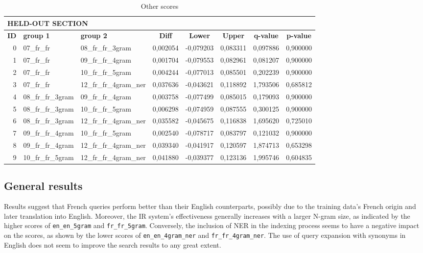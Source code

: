 \begin{table}[h!]
    \centering
    \caption{Other scores}
    \label{tab:other_scores}
    \begin{tabular}{|r|l|l||c|c|c|c|c|}
    \hline
        \multicolumn{8}{|l|}{\textbf{HELD-OUT SECTION}} \\ \hline\hline
        \textbf{ID} & \textbf{group 1} & \textbf{group 2} & \textbf{Diff} & \textbf{Lower} & \textbf{Upper} & \textbf{q-value} & \textbf{p-value} \\ \hline
        0 & 07\_fr\_fr & 08\_fr\_fr\_3gram & 0,002054 & -0,079203 & 0,083311 & 0,097886 & 0,900000 \\ \hline
        1 & 07\_fr\_fr & 09\_fr\_fr\_4gram & 0,001704 & -0,079553 & 0,082961 & 0,081207 & 0,900000 \\ \hline
        2 & 07\_fr\_fr & 10\_fr\_fr\_5gram & 0,004244 & -0,077013 & 0,085501 & 0,202239 & 0,900000 \\ \hline
        3 & 07\_fr\_fr & 12\_fr\_fr\_4gram\_ner & 0,037636 & -0,043621 & 0,118892 & 1,793506 & 0,685812 \\ \hline
        4 & 08\_fr\_fr\_3gram & 09\_fr\_fr\_4gram & 0,003758 & -0,077499 & 0,085015 & 0,179093 & 0,900000 \\ \hline
        5 & 08\_fr\_fr\_3gram & 10\_fr\_fr\_5gram & 0,006298 & -0,074959 & 0,087555 & 0,300125 & 0,900000 \\ \hline
        6 & 08\_fr\_fr\_3gram & 12\_fr\_fr\_4gram\_ner & 0,035582 & -0,045675 & 0,116838 & 1,695620 & 0,725010 \\ \hline
        7 & 09\_fr\_fr\_4gram & 10\_fr\_fr\_5gram & 0,002540 & -0,078717 & 0,083797 & 0,121032 & 0,900000 \\ \hline
        8 & 09\_fr\_fr\_4gram & 12\_fr\_fr\_4gram\_ner & 0,039340 & -0,041917 & 0,120597 & 1,874713 & 0,653298 \\ \hline
        9 & 10\_fr\_fr\_5gram & 12\_fr\_fr\_4gram\_ner & 0,041880 & -0,039377 & 0,123136 & 1,995746 & 0,604835 \\ \hline
    \end{tabular}
\end{table}

\subsection{General results}\label{subsec:general-results}

Results suggest that French queries perform better than their English counterparts, possibly due to the training data's
French origin and later translation into English.
Moreover, the IR system's effectiveness generally increases with a larger N-gram size, as indicated by the higher scores
of \texttt{en\_en\_5gram} and \texttt{fr\_fr\_5gram}.
Conversely, the inclusion of NER in the indexing process seems to have a negative impact on the scores, as shown by the
lower scores of \texttt{en\_en\_4gram\_ner} and \texttt{fr\_fr\_4gram\_ner}.
The use of query expansion with synonyms in English does not seem to improve the search results to any great extent.\\

